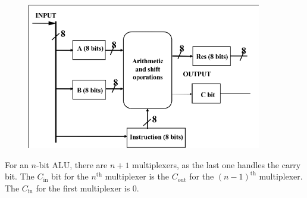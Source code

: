 \documentclass[a4paper, 12pt]{article}
\begin{document}
                \begin{figure}[h!]\includegraphics[width=\linewidth]{2019-04-08-20-08-22.png}\end{figure}

                For an $n$-bit ALU, there are $n + 1$ multiplexers, as the last one handles the carry bit. The $C_\text{in}$ bit for the $n^\text{th}$ multiplexer is the $C_\text{out}$ for the $(n - 1)^\text{th}$ multiplexer. The $C_\text{in}$ for the first multiplexer is 0.
\end{document}
